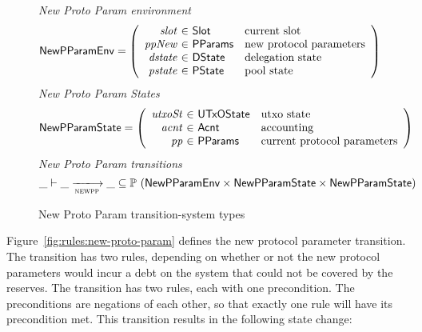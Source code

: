 \begin{figure}[htb]
  \emph{New Proto Param environment}
  \begin{equation*}
    \NewPParamEnv =
    \left(
      \begin{array}{r@{~\in~}ll}
        \var{slot} & \Slot & \text{current slot}\\
        \var{ppNew} & \PParams & \text{new protocol parameters}\\
        \var{dstate} & \DState & \text{delegation state}\\
        \var{pstate} & \PState & \text{pool state}\\
      \end{array}
    \right)
  \end{equation*}
  \emph{New Proto Param States}
  \begin{equation*}
    \NewPParamState =
    \left(
      \begin{array}{r@{~\in~}ll}
        \var{utxoSt} & \UTxOState & \text{utxo state}\\
        \var{acnt} & \Acnt & \text{accounting}\\
        \var{pp} & \PParams & \text{current protocol parameters}\\
      \end{array}
    \right)
  \end{equation*}
  \emph{New Proto Param transitions}
  \begin{equation*}
    \_ \vdash
    \var{\_} \trans{newpp}{} \var{\_}
    \subseteq \powerset (\NewPParamEnv \times \NewPParamState \times \NewPParamState)
  \end{equation*}
  \caption{New Proto Param transition-system types}
  \label{fig:ts-types:new-proto-param}
\end{figure}


Figure~\ref{fig:rules:new-proto-param} defines the new protocol parameter transition.
The transition has two rules, depending on whether or not the new protocol parameters
would incur a debt on the system that could not be covered by the reserves.
The transition has two rules, each with one precondition. The preconditions are
negations of each other, so that exactly one rule will have its precondition met.
This transition results in the following state change:

